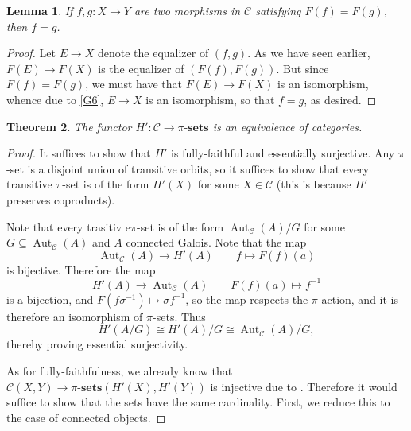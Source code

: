 \documentclass[10pt]{article}
\theoremstyle{thmstyle}
\newtheorem{theorem}{Theorem}[section]
\newtheorem{lemma}[theorem]{Lemma}
\theoremstyle{defstyle}
\newcommand{\sets}[1]{#1\text{-}\mathbf{sets}}
\newcommand{\Aut}{\operatorname{Aut}}
\newcommand{\scrC}{\mathscr{C}} %
\begin{document}
\begin{lemma}
    If $f,g: X\to Y$ are two morphisms in $\scrC$ satisfying $F(f) = F(g)$, then $f = g$.
\end{lemma}
\begin{proof}
    Let $E\to X$ denote the equalizer of $(f,g)$. As we have seen earlier, $F(E)\to F(X)$ is the equalizer of $(F(f), F(g))$. But since $F(f) = F(g)$, we must have that $F(E)\to F(X)$ is an isomorphism, whence due to \ref{G6}, $E\to X$ is an isomorphism, so that $f = g$, as desired.
\end{proof}

\begin{theorem}
    The functor $H':\scrC\to\sets{\pi}$ is an equivalence of categories. 
\end{theorem}
\begin{proof}
    It suffices to show that $H'$ is fully-faithful and essentially surjective. Any $\pi$-set is a disjoint union of transitive orbits, so it suffices to show that every transitive $\pi$-set is of the form $H'(X)$ for some $X\in\scrC$ (this is because $H'$ preserves coproducts).

    Note that every trasitiv e$\pi$-set is of the form $\Aut_{\scrC}(A)/G$ for some $G\subseteq\Aut_{\scrC}(A)$ and $A$ connected Galois. Note that the map 
    \begin{equation*}
        \Aut_{\scrC}(A)\longrightarrow H'(A)\qquad f\longmapsto F(f)(a)
    \end{equation*}
    is bijective. Therefore the map 
    \begin{equation*}
        H'(A)\longrightarrow\Aut_{\scrC}(A)\qquad F(f)(a)\longmapsto f^{-1}
    \end{equation*}
    is a bijection, and $F(f\sigma^{-1})\longmapsto\sigma f^{-1}$, so the map respects the $\pi$-action, and it is therefore an isomorphism of $\pi$-sets. Thus 
    \begin{equation*}
        H'(A/G)\cong H'(A)/G\cong\Aut_{\scrC}(A)/G,
    \end{equation*}
    thereby proving essential surjectivity.

    As for fully-faithfulness, we already know that $\scrC(X, Y)\to\sets{\pi}\left(H'(X), H'(Y)\right)$ is injective due to . Therefore it would suffice to show that the sets have the same cardinality. First, we reduce this to the case of connected objects. 


\end{proof}
\end{document}
